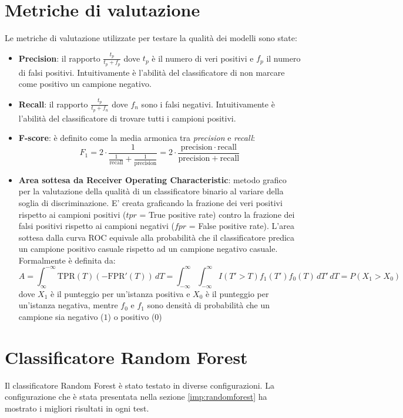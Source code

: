 \section{Metriche di valutazione}
\label{metriche}
Le metriche di valutazione utilizzate per testare la qualità dei modelli sono state:
\begin{itemize}
\item \textbf{Precision}: il rapporto $\frac{t_p}{t_p+f_p}$ dove $t_p$ è il numero di veri positivi e $f_p$ il numero di falsi positivi. Intuitivamente è l'abilità del classificatore di non marcare come positivo un campione negativo.
\item \textbf{Recall}: il rapporto $\frac{t_p}{t_p+f_n}$  dove $f_n$ sono i falsi negativi. Intuitivamente è l'abilità del classificatore di trovare tutti i campioni positivi.
\item \textbf{F-score}: è definito come la media armonica tra \textit{precision} e \textit{recall}: 
\[F_1 = 2 \cdot \frac{1}{\tfrac{1}{\mathrm{recall}} + \tfrac{1}{\mathrm{precision}}} = 2 \cdot \frac{\mathrm{precision} \cdot \mathrm{recall}}{\mathrm{precision} + \mathrm{recall}}\]
\item \textbf{Area sottesa da Receiver Operating Characteristic}:  metodo grafico per la valutazione della qualità di un classificatore binario al variare della soglia di discriminazione. E' creata graficando la frazione dei veri positivi rispetto ai campioni positivi ($tpr$ = True positive rate) contro la frazione dei falsi positivi rispetto ai campioni negativi ($fpr$ = False positive rate). L'area sottesa dalla curva ROC equivale alla probabilità che il classificatore predica un campione positivo casuale rispetto ad un campione negativo casuale. Formalmente è definita da:
\[ A = \int_{\infty}^{-\infty} \mbox{TPR}(T) \left(-\mbox{FPR}'(T)\right) \, dT = \int_{-\infty}^{\infty} \int_{-\infty}^{\infty} I(T'>T)f_1(T') f_0(T) \, dT' \, dT = P(X_1 > X_0)\]
dove 
$X_{1}$ è il punteggio per un'istanza positiva e $X_{0}$ è il punteggio per un'istanza negativa, mentre $f_{0}$ e $f_{1}$ sono densità di probabilità che un campione sia negativo ($1$) o positivo ($0$)
\end{itemize}

\newpage
\section{Classificatore Random Forest}
\label{res:crf}
Il classificatore Random Forest è stato testato in diverse configurazioni. La configurazione che è stata presentata nella sezione \ref{imp:randomforest} ha mostrato i migliori risultati in ogni test.

